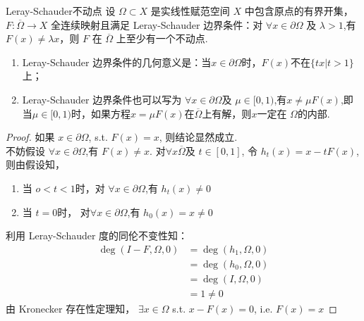 \documentclass[a4,10pt]{ctexart}
\begin{document}
\begin{dl}{Leray-Schauder不动点}{}
  设 $\Omega\subset{X}$ 是实线性赋范空间 $X$ 中包含原点的有界开集， $F:\overline{\Omega}\to{X}$ 全连续映射且满足 Leray-Schauder 边界条件：对 
  $\forall{x}\in\partial{\Omega}$ 及 $\lambda>1$,有 $F(x)\neq{\lambda{x}}$，则 $F$ 在 $\overline{\Omega}$ 上至少有一个不动点.
\end{dl}
\begin{zy}
  \begin{enumerate}
    \item Leray-Schauder 边界条件的几何意义是：当$x\in\partial{\Omega}$时，$F(x)$不在$\{tx|t>1\}$上；
    \item Leray-Schauder 边界条件也可以写为 $\forall{x}\in\partial{\Omega}$及 $\mu\in[0,1)$,有$x\neq\mu{F(x)}$,即当$\mu\in[0,1)$时，如果方程$x=\mu{F(x)}$在$\overline{\Omega}$上有解，则$x$一定在 $\Omega$的内部.
  \end{enumerate}
\end{zy}
\begin{proof}
如果 $x\in{\partial\Omega}$, s.t. $F(x)=x$, 则结论显然成立.\\
不妨假设 $\forall{x}\in \partial\Omega$,有 $F(x)\neq{x}$. 对$\forall{x}\overline{\Omega}$及 $t\in[0,1]$, 令 $h_t(x)=x-tF(x)$, 则由假设知，\\
\begin{enumerate}
  \item 当 $o<t<1$时，对 $\forall{x}\in \partial\Omega$,有 $h_t(x)\neq{0}$
  \item 当 $t=0$时， 对$\forall{x}\in \partial\Omega$,有 $h_0(x)=x\neq{0}$
\end{enumerate}
利用 Leray-Schauder 度的同伦不变性知：
\[ 
  \begin{aligned}
    \deg({I-F},{\Omega}, {0}) &= \deg({h_1},{\Omega}, {0})\\
    &= \deg({h_0},{\Omega}, {0})\\
    &= \deg({I},{\Omega}, {0}) \\
    &= 1 \neq{0}    
  \end{aligned} 
\]
由 Kronecker 存在性定理知， $\exists{x}\in\Omega$ s.t. $x-F(x)=0$, i.e. $F(x)=x$
\end{proof}
\end{document}
